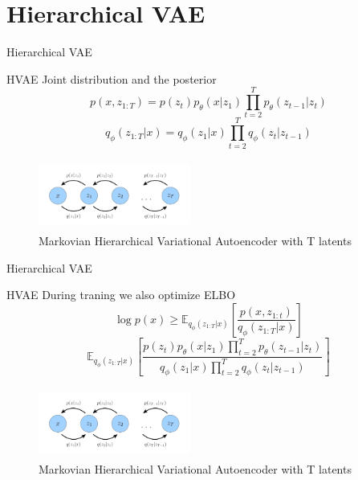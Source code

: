 \documentclass{beamer}
\begin{document}
\section{Hierarchical VAE}
\begin{frame}{Hierarchical VAE}
    \begin{block}{HVAE}
    Joint distribution and the posterior
    \[p(x, z_{1:T}) = p(z_t) p_{\theta}(x|z_1)\prod_{t=2}^T p_{\theta}(z_{t-1}|z_t)\]
    \[q_{\phi}(z_{1:T}|x) = q_{\phi}(z_1|x)\prod_{t=2}^Tq_{\phi}(z_t|z_{t-1})\]
    \end{block}
    \begin{figure}[h]
        \centering
        \includegraphics[width=5cm, height=2.3cm]{diffusion_2.png}
    \caption{Markovian Hierarchical Variational Autoencoder with T latents}
    \end{figure}
\end{frame}


\begin{frame}{Hierarchical VAE}
    \begin{block}{HVAE}
    During traning we also optimize ELBO
    \[\log p(x) \geq \mathbb{E}_{q_{\phi}(z_{1:T}|x)}\left[\dfrac{p(x, z_{1:t})}{q_{\phi}(z_{1:T}|x)}\right]\]
    \[\mathbb{E}_{q_{\phi}(z_{1:T}|x)}\left[\dfrac{p(z_t) p_{\theta}(x|z_1)\prod_{t=2}^T p_{\theta}(z_{t-1}|z_t)}{q_{\phi}(z_1|x)\prod_{t=2}^Tq_{\phi}(z_t|z_{t-1})}\right]\]
    \end{block}
    \begin{figure}[h]
        \centering
        \includegraphics[width=5cm, height=2.3cm]{diffusion_2.png}
    \caption{Markovian Hierarchical Variational Autoencoder with T latents}
    \end{figure}
\end{frame}
\end{document}
